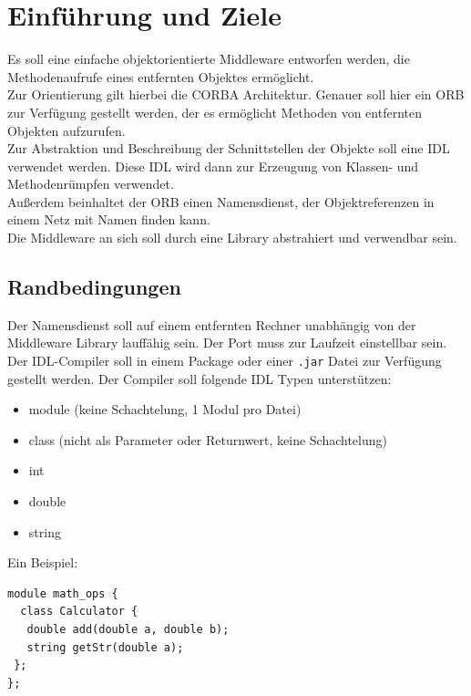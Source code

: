 \documentclass{article}
\begin{document}
\section{Einführung und Ziele}
Es soll eine einfache objektorientierte Middleware entworfen werden, die Methodenaufrufe
eines entfernten Objektes ermöglicht.\\

Zur Orientierung gilt hierbei die CORBA Architektur. Genauer soll hier ein ORB zur
Verfügung gestellt werden, der es ermöglicht Methoden von entfernten Objekten aufzurufen.\\

Zur Abstraktion und Beschreibung der Schnittstellen der Objekte soll eine IDL verwendet werden.
Diese IDL wird dann zur Erzeugung von Klassen- und Methodenrümpfen verwendet.\\

Außerdem beinhaltet der ORB einen Namensdienst, der Objektreferenzen in einem Netz mit Namen finden
kann.\\

Die Middleware an sich soll durch eine Library abstrahiert und verwendbar sein.

\subsection{Randbedingungen}
Der Namensdienst soll auf einem entfernten Rechner unabhängig von der Middleware Library
lauffähig sein. Der Port muss zur Laufzeit einstellbar sein.\\

Der IDL-Compiler soll in einem Package oder einer \texttt{.jar} Datei zur Verfügung gestellt
werden. Der Compiler soll folgende IDL Typen unterstützen:

\begin{itemize}
    \item module (keine Schachtelung, 1 Modul pro Datei)
    \item class (nicht als Parameter oder Returnwert, keine Schachtelung)
    \item int
    \item double
    \item string
\end{itemize}

Ein Beispiel:
\begin{lstlisting}
module math_ops {
  class Calculator {
   double add(double a, double b);
   string getStr(double a);
 };
};
\end{lstlisting}
\end{document}

